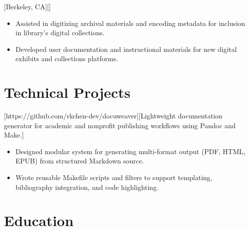 \documentclass{patchworker}
\begin{document}
        [Berkeley, CA][]
        \begin{itemize}
  \item Assisted in digitizing archival materials and encoding metadata for inclusion in library's digital collections.
  \item Developed user documentation and instructional materials for new digital exhibits and collections platforms.
\end{itemize}

\section*{Technical Projects}

        [https://github.com/rkchen-dev/docuweaver][Lightweight documentation generator for academic and nonprofit publishing workflows using Pandoc and Make.]
        \begin{itemize}
  \item Designed modular system for generating multi-format output (PDF, HTML, EPUB) from structured Markdown source.
  \item Wrote reusable Makefile scripts and filters to support templating, bibliography integration, and code highlighting.
\end{itemize}

\section*{Education}

\end{document}
